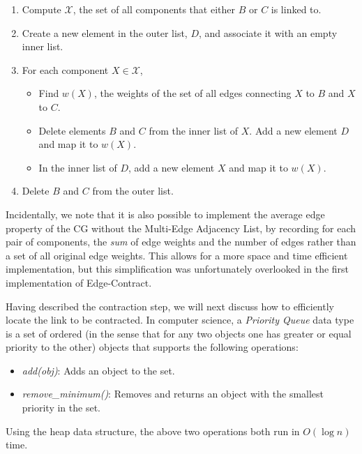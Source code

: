 \begin{enumerate}
\item
Compute $\mathcal{X}$, the set of all components that either $B$ or $C$
is linked to.

\item
Create a new element in the outer list, $D$, and associate it with an
empty inner list.

\item
For each component $X \in \mathcal{X}$,
\begin{itemize}
\item
Find $w(X)$, the weights of the set of all edges connecting $X$ to $B$
and $X$ to $C$.

\item
Delete elements $B$ and $C$ from the inner list of $X$.
Add a new element $D$ and map it to $w(X)$.

\item
In the inner list of $D$, add a new element $X$ and map it to $w(X)$.
\end{itemize}

\item
Delete $B$ and $C$ from the outer list.
\end{enumerate}

Incidentally, we note that it is also possible to implement the average
edge property of the CG without the Multi-Edge Adjacency List, by
recording for each pair of components, the \textit{sum} of edge weights
and the number of edges rather than a set of all original edge weights.
This allows for a more space and time efficient implementation, but this
simplification was unfortunately overlooked in the first implementation
of Edge-Contract.

Having described the contraction step, we will next discuss how to
efficiently locate the link to be contracted.
In computer science, a \textit{Priority Queue} data type is a set of
ordered (in the sense that for any two objects one has greater or equal
priority to the other) objects that supports the following operations:

\begin{itemize}
\item
\textit{add(obj)}: Adds an object to the set.

\item
\textit{remove\_minimum()}: Removes and returns an object with the
smallest priority in the set.
\end{itemize}

Using the heap data structure, the above two operations both run in
$O(\log n)$ time.

